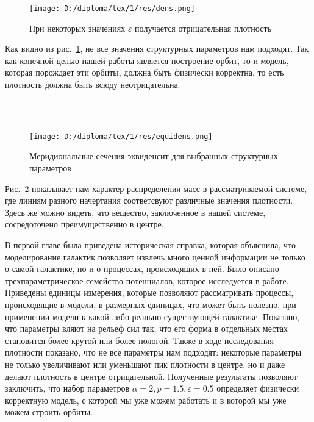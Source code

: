 \begin{figure}[H]
\centering
\begin{minipage}[t]{0.49\textwidth}
\centering
\texttt{[image: D:/diploma/tex/1/res/dens.png]}
\end{minipage}
\caption{При некоторых  значениях $\varepsilon$ получается отрицательная плотность}\label{rho:unreal}
\end{figure}
{\flushleft Как видно из рис.~\ref{rho:unreal}, не все значения структурных параметров нам подходят. Так как конечной целью нашей работы является построение орбит, то и модель, которая порождает эти орбиты, должна быть физически корректна, то есть плотность должна быть всюду неотрицательна.}


~\\
~\\
{
\begin{figure}[H]
\centering
\begin{minipage}[t]{0.45\textwidth}
\centering
\texttt{[image: D:/diploma/tex/1/res/equidens.png]}
\end{minipage}
\caption{Меридиональные сечения эквиденсит для выбранных структурных параметров}\label{rho:eqidens}
\end{figure}
}
{\flushleft Рис.~\ref{rho:eqidens} показывает нам характер распределения масс в рассматриваемой системе, где линиям разного начертания соответсвуют различные значения плотности. Здесь же можно видеть, что вещество, заключенное в нашей системе, сосредоточено преимущественно в центре.}\par
В первой главе была приведена историческая справка, которая объяснила, что моделирование галактик позволяет извлечь много ценной информации не только о самой галактике, но и о процессах, происходящих в ней. Было описано трехпараметрическое семейство потенциалов, которое исследуется в работе. Приведены единицы измерения, которые позволяют рассматривать процессы, происходящие в модели, в размерных единицах, что может быть полезно, при применении модели к какой-либо реально существующей галактике. Показано, что параметры вляют на рельеф сил так, что его форма в отдельных местах становится более крутой или более пологой. Также в ходе исследования плотности показано, что не все параметры нам подходят: некоторые параметры не только увеличивают или уменьшают пик плотности в центре, но и даже делают плотность в центре отрицательной. Полученные результаты позволяют заключить, что набор параметров $\alpha = 2, p = 1.5, \varepsilon = 0.5$ определяет физически корректную модель, с которой мы уже можем работать и в которой мы уже можем строить орбиты.
